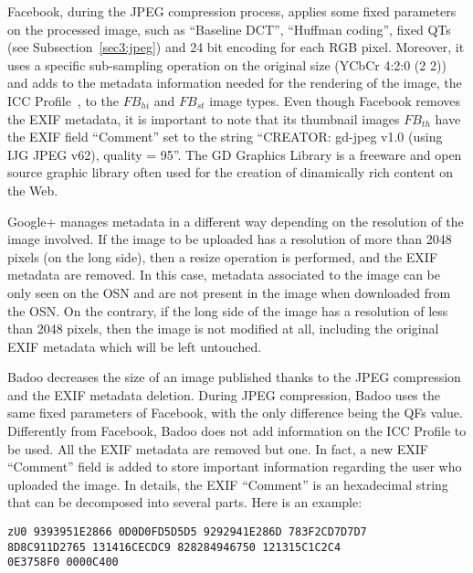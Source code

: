 \documentclass[10pt, conference]{IEEEtran}
\begin{document}
Facebook, during the JPEG compression process, applies some fixed parameters on the processed image, such as ``Baseline DCT'', ``Huffman coding'', fixed QTs (see Subsection~\ref{sec3:jpeg}) and 24 bit encoding for each RGB pixel. Moreover, it uses a specific sub-sampling operation on the original size (YCbCr 4:2:0 (2 2))
and adds to the metadata information needed for the rendering of the image, the ICC Profile~\cite{icc}, to the $FB_{hi}$ and $FB_{st}$ image types.
Even though Facebook removes the EXIF metadata, it is important to note that its thumbnail images $FB_{th}$ have the EXIF field ``Comment'' set to the string ``CREATOR: gd-jpeg v1.0 (using IJG JPEG v62), quality = 95''. The GD Graphics Library is a freeware and open source graphic library often used for the creation of dinamically rich content on the Web.

Google+ manages metadata in a different way depending on the resolution of the image involved.
If the image to be uploaded has a resolution of more than 2048 pixels (on the long side), then a resize operation is performed, and the EXIF metadata are removed. In this case, metadata associated to the image can be only seen on the OSN and are not present in the image when downloaded from the OSN. On the contrary, if the long side of the image has a resolution of less than 2048 pixels, then the image is not modified at all, including the original EXIF metadata which will be left untouched.

Badoo decreases the size of an image published thanks to the JPEG compression and the EXIF metadata deletion. During JPEG compression, Badoo uses the same fixed parameters of Facebook, with the only difference being the QFs value. Differently from Facebook, Badoo does not add information on the ICC Profile to be used.
All the EXIF metadata are removed but one. In fact, a new EXIF ``Comment'' field is added to store important information regarding the user who uploaded the image. 
In details, the EXIF ``Comment'' is an hexadecimal string that can be decomposed into several parts. 
Here is an example:

\scriptsize
\begin{verbatim}
zU0 9393951E2866 0D0D0FD5D5D5 9292941E286D 783F2CD7D7D7 
8D8C911D2765 131416CECDC9 828284946750 121315C1C2C4 
0E3758F0 0000C400
\end{verbatim}
\normalsize
\end{document}
